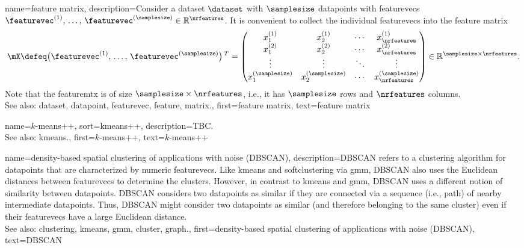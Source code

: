 {name={feature matrix}, 
	description={Consider a \gls{dataset} $\dataset$ 
		with $\samplesize$ \glspl{datapoint} with \glspl{featurevec} 
		$\featurevec^{(1)}, \,\ldots, \,\featurevec^{(\samplesize)} \in \mathbb{R}^{\nrfeatures}$. 
		It is convenient to collect the individual \glspl{featurevec} into 
		the \gls{feature} \gls{matrix} 
		$$\mX \defeq \big(\featurevec^{(1)}, \,\ldots, \,\featurevec^{(\samplesize)}\big)\,^{T} =
\begin{pmatrix}
x^{(1)}_{1} & x^{(1)}_{2} & \cdots & x^{(1)}_{\nrfeatures} \\
x^{(2)}_{1} & x^{(2)}_{2} & \cdots & x^{(2)}_{\nrfeatures} \\
\vdots      & \vdots      & \ddots & \vdots \\
x^{(\samplesize)}_{1} & x^{(\samplesize)}_{2} & \cdots & x^{(\samplesize)}_{\nrfeatures}
\end{pmatrix}
\in \mathbb{R}^{\samplesize \times \nrfeatures}.$$
		Note that the \gls{featuremtx} is of size $\samplesize \times \nrfeatures$, i.e., 
		it has $\samplesize$ rows and $\nrfeatures$ columns.
				\\
		See also: \gls{dataset}, \gls{datapoint}, \gls{featurevec}, \gls{feature}, \gls{matrix}.},
	first={feature matrix},
	text={feature matrix} 
}

{name={$k$-means++}, 
 sort={kmeans++},
	description={TBC.
				\\
		See also: \gls{kmeans}.},
	first={$k$-means++},
	text={$k$-means++} 
}


{name={density-based spatial clustering of applications with noise (DBSCAN)}, 
	description={DBSCAN 
		refers to a \gls{clustering} \gls{algorithm} for \glspl{datapoint} that are characterized by numeric \glspl{featurevec}. 
		Like \gls{kmeans} and \gls{softclustering} via \gls{gmm}, DBSCAN also uses the Euclidean 
		distances between \glspl{featurevec} to determine the \glspl{cluster}. However, in contrast to \gls{kmeans} 
		and \gls{gmm}, DBSCAN uses a different notion of similarity between \glspl{datapoint}. 
		DBSCAN considers two \glspl{datapoint} as similar if they are connected 
		via a sequence (i.e., path) of nearby intermediate \glspl{datapoint}. Thus, DBSCAN might consider 
		two \glspl{datapoint} as similar (and therefore belonging to the same cluster) even if 
		their \glspl{featurevec} have a large Euclidean distance.
				\\
		See also: \gls{clustering}, \gls{kmeans}, \gls{gmm}, \gls{cluster}, \gls{graph}.},
	first={density-based spatial clustering of applications with noise (DBSCAN)},
	text={DBSCAN} 
}

